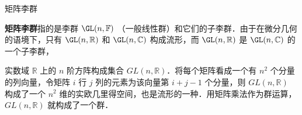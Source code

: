 
\begin{definition}{矩阵李群}

\textbf{矩阵李群}指的是李群 $\GL(n, \mathbb{F})$ （一般线性群）和它们的子李群．由于在微分几何的语境下，只有 $\GL(n, \mathbb{R})$ 和 $\GL(n, \mathbb{C})$ 构成流形，而 $\GL(n, \mathbb{R})$ 是 $\GL(n, \mathbb{C})$ 的一个子李群，

实数域 $\mathbb{R}$ 上的 $n$ 阶方阵构成集合 $GL(n, \mathbb{R})$．将每个矩阵看成一个有 $n^2$ 个分量的列向量，令矩阵 $i$ 行 $j$ 列的元素为该向量第 $i+j-1$ 个分量，则 $GL(n, \mathbb{R})$ 构成了一个 $n^2$ 维的实欧几里得空间，也是流形的一种．用矩阵乘法作为群运算，$GL(n, \mathbb{R})$ 就构成了一个群．

\end{definition}